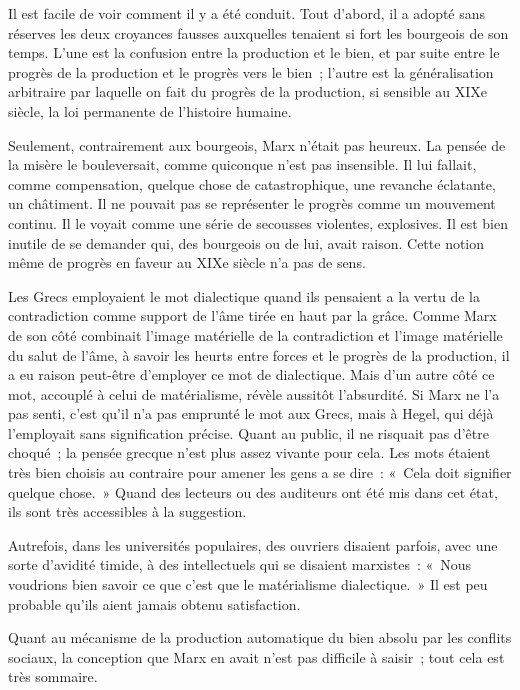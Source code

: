 \documentclass[french,twoside]{book} %
\begin{document}
Il est facile de voir comment il y a été conduit. Tout d'abord, il a adopté sans réserves les deux croyances fausses auxquelles tenaient si fort les bourgeois de son temps. L'une est la confusion entre la production et le bien, et par suite entre le progrès de la production et le progrès vers le bien ; l'autre est la généralisation arbitraire par laquelle on fait du progrès de la production, si sensible au XIXe siècle, la loi permanente de l'histoire humaine.\par
Seulement, contrairement aux bourgeois, Marx n'était pas heureux. La pensée de la misère le bouleversait, comme quiconque n'est pas insensible. Il lui fallait, comme compensation, quelque chose de catastrophique, une revanche éclatante, un châtiment. Il ne pouvait pas se représenter le progrès comme un mouvement continu. Il le voyait comme une série de secousses violentes, explosives. Il est bien inutile de se demander qui, des bourgeois ou de lui, avait raison. Cette notion même de progrès en faveur au XIXe siècle n'a pas de sens.\par
Les Grecs employaient le mot dialectique quand ils pensaient a la vertu de la contradiction comme support de l'âme tirée en haut par la grâce. Comme Marx de son côté combinait l'image matérielle de la contradiction et l'image matérielle du salut de l'âme, à savoir les heurts entre forces et le progrès de la production, il a eu raison peut-être d'employer ce mot de dialectique. Mais d'un autre côté ce mot, accouplé à celui de matérialisme, révèle aussitôt l'absurdité. Si Marx ne l'a pas senti, c'est qu'il n'a pas emprunté le mot aux Grecs, mais à Hegel, qui déjà l'employait sans signification précise. Quant au public, il ne risquait pas d'être choqué ; la pensée grecque n'est plus assez vivante pour cela. Les mots étaient très bien choisis au contraire pour amener les gens a se dire : « Cela doit signifier quelque chose. » Quand des lecteurs ou des auditeurs ont été mis dans cet état, ils sont très accessibles à la suggestion.\par
Autrefois, dans les universités populaires, des ouvriers disaient parfois, avec une sorte d'avidité timide, à des intellectuels qui se disaient marxistes : « Nous voudrions bien savoir ce que c'est que le matérialisme dialectique. » Il est peu probable qu'ils aient jamais obtenu satisfaction.\par
Quant au mécanisme de la production automatique du bien absolu par les conflits sociaux, la conception que Marx en avait n'est pas difficile à saisir ; tout cela est très sommaire.\par
\end{document}
